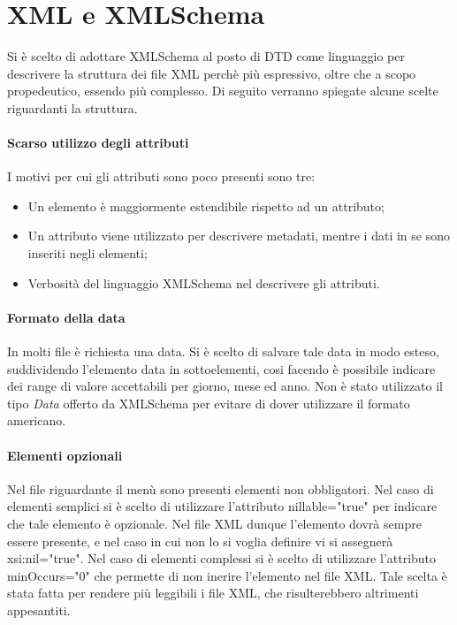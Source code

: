 \section{XML e XMLSchema}
Si è scelto di adottare XMLSchema al posto di DTD come linguaggio per descrivere la struttura dei file XML perchè più espressivo, oltre che a scopo propedeutico, essendo più complesso. Di seguito verranno spiegate alcune scelte riguardanti la struttura.

\paragraph{Scarso utilizzo degli attributi}

I motivi per cui gli attributi sono poco presenti sono tre:
\begin{itemize}
\item Un elemento è maggiormente estendibile rispetto ad un attributo;
\item Un attributo viene utilizzato per descrivere metadati, mentre i dati in se sono inseriti negli elementi;
\item Verbosità del linguaggio XMLSchema nel descrivere gli attributi.
\end{itemize}

\paragraph{Formato della data}
In molti file è richiesta una data. Si è scelto di salvare tale data in modo esteso, suddividendo l'elemento data in sottoelementi, cosi facendo è possibile indicare dei range di valore accettabili per giorno, mese ed anno. 
Non è stato utilizzato il tipo \emph{Data} offerto da XMLSchema per evitare di dover utilizzare il formato americano.

\paragraph{Elementi opzionali}
Nel file riguardante il menù sono presenti elementi non obbligatori. Nel caso di elementi semplici si è scelto di utilizzare l'attributo nillable="true" per indicare che tale elemento è opzionale. Nel file XML dunque l'elemento dovrà sempre essere presente, e nel caso in cui non lo si voglia definire vi si assegnerà xsi:nil="true".  
Nel caso di elementi complessi si è scelto di utilizzare l'attributo minOccurs="0" che permette di non inerire l'elemento nel file XML. Tale scelta è stata fatta per rendere più leggibili i file XML, che risulterebbero altrimenti appesantiti.

